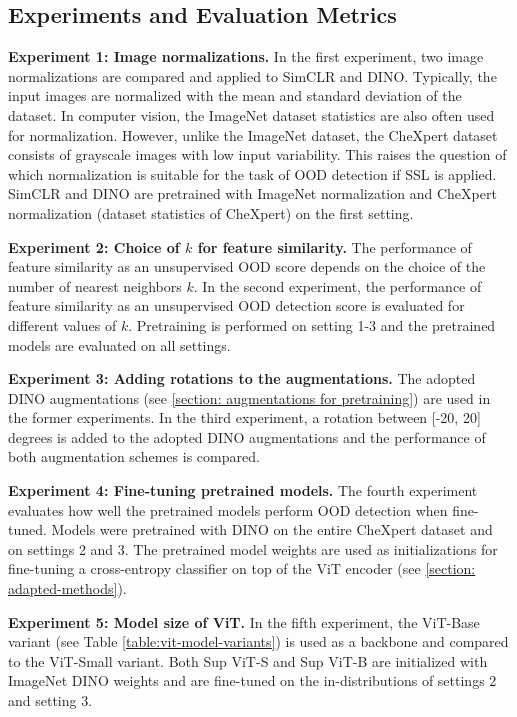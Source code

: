 \subsection{Experiments and Evaluation Metrics}
\label{section: experiments}
\textbf{Experiment 1: Image normalizations.} In the first experiment, two image normalizations are compared and applied to SimCLR and DINO.
Typically, the input images are normalized with the mean and standard deviation of the dataset.
In computer vision, the ImageNet dataset statistics \citep{Deng2009} are also often used for normalization.
However, unlike the ImageNet dataset, the CheXpert dataset consists of grayscale images with low input variability.
This raises the question of which normalization is suitable for the task of OOD detection if SSL is applied.
SimCLR and DINO are pretrained with ImageNet normalization and CheXpert normalization (dataset statistics of CheXpert) on the first setting.
\par
\textbf{Experiment 2: Choice of $k$ for feature similarity.} The performance of feature similarity as an unsupervised OOD score depends on the choice of the number of nearest neighbors $k$.
In the second experiment, the performance of feature similarity as an unsupervised OOD detection score is evaluated for different values of $k$.
Pretraining is performed on setting 1-3 and the pretrained models are evaluated on all settings.
\par
\textbf{Experiment 3: Adding rotations to the augmentations.}
The adopted DINO augmentations (see \ref{section: augmentations for pretraining}) are used in the former experiments.
In the third experiment, a rotation between [-20, 20] degrees is added to the adopted DINO augmentations and the performance of both augmentation schemes is compared.
\par
\textbf{Experiment 4: Fine-tuning pretrained models.}
The fourth experiment evaluates how well the pretrained models perform OOD detection when fine-tuned.
Models were pretrained with DINO on the entire CheXpert dataset and on settings 2 and 3.
The pretrained model weights are used as initializations for fine-tuning a cross-entropy classifier on top of the ViT encoder (see \ref{section: adapted-methods}).
\par
\textbf{Experiment 5: Model size of ViT.}
In the fifth experiment, the ViT-Base variant (see Table \ref{table:vit-model-variants}) is used as a backbone and compared to the ViT-Small variant.
Both Sup ViT-S and Sup ViT-B are initialized with ImageNet DINO weights and are fine-tuned on the in-distributions of settings 2 and setting 3.
